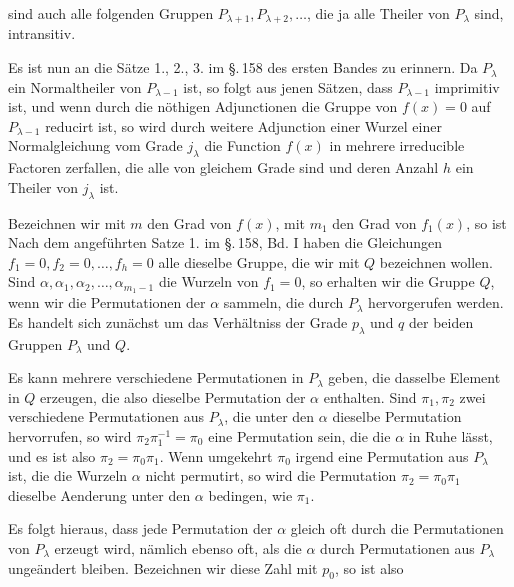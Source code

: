 sind auch alle folgenden Gruppen $P_{\lambda+1}, P_{\lambda+2}, \ldots$, die ja alle
Theiler von $P_\lambda$ sind, intransitiv.

Es ist nun an die Sätze 1., 2., 3. im §.\,158 des ersten Bandes zu erinnern. Da
$P_\lambda$ ein Normaltheiler von $P_{\lambda-1}$ ist, so folgt aus jenen Sätzen,
dass $P_{\lambda-1}$ imprimitiv ist, und wenn durch die nöthigen Adjunctionen die
Gruppe von $f(x) = 0$ auf $P_{\lambda-1}$ reducirt ist, so wird durch weitere
Adjunction einer Wurzel einer Normalgleichung vom Grade $j_\lambda$ die Function
$f(x)$ in mehrere irreducible Factoren
zerfallen, die alle von gleichem Grade sind und deren Anzahl $h$ ein Theiler von
$j_\lambda$ ist.

Bezeichnen wir mit $m$ den Grad von $f(x)$, mit $m_1$ den Grad von $f_1(x)$, so ist
Nach dem angeführten Satze 1. im §.\,158, Bd. I haben die Gleichungen
$f_1 = 0, f_2 = 0, \ldots, f_h = 0$ alle dieselbe Gruppe, die wir mit $Q$ bezeichnen
wollen. Sind $\alpha, \alpha_1, \alpha_2, \ldots, \alpha_{m_1-1}$ die Wurzeln von
$f_1 = 0$, so erhalten wir die Gruppe $Q$, wenn wir die Permutationen der $\alpha$
sammeln, die durch $P_\lambda$ hervorgerufen werden. Es handelt sich zunächst um
das Verhältniss der Grade $p_\lambda$ und $q$ der beiden Gruppen $P_\lambda$ und $Q$.

Es kann mehrere verschiedene Permutationen in $P_\lambda$ geben, die dasselbe
Element in $Q$ erzeugen, die also dieselbe Permutation der $\alpha$ enthalten.
Sind $\pi_1, \pi_2$ zwei verschiedene Permutationen aus $P_\lambda$, die unter den
$\alpha$ dieselbe Permutation hervorrufen, so wird $\pi_2 \pi_1^{-1} = \pi_0$ eine
Permutation sein, die die $\alpha$ in Ruhe lässt, und es ist also
$\pi_2 = \pi_0 \pi_1$. Wenn umgekehrt $\pi_0$ irgend eine Permutation aus
$P_\lambda$ ist, die die Wurzeln $\alpha$ nicht permutirt, so wird die Permutation
$\pi_2 = \pi_0 \pi_1$ dieselbe Aenderung unter den $\alpha$ bedingen, wie $\pi_1$.

Es folgt hieraus, dass jede Permutation der $\alpha$ gleich oft durch die
Permutationen von $P_\lambda$ erzeugt wird, nämlich ebenso oft, als die $\alpha$
durch Permutationen aus $P_\lambda$ ungeändert bleiben. Bezeichnen wir diese Zahl
mit $p_0$, so ist also
